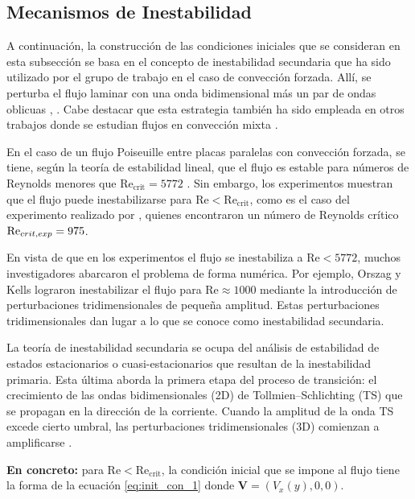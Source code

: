 \subsection{Mecanismos de Inestabilidad} \label{sec:mecanismo}

A continuación, la construcción de las condiciones iniciales que se consideran en \linebreak esta subsección se basa en el concepto de inestabilidad secundaria que ha sido utilizado por el grupo de trabajo en el caso de convección forzada. Allí, se perturba el flujo \linebreak laminar con una onda bidimensional más un par de ondas oblicuas \cite{machaca2024}, \cite{schmid}. Cabe destacar que esta estrategia también ha sido empleada en otros trabajos donde se estudian flujos en convección mixta \cite{chen2003direct}.  

En el caso de un flujo Poiseuille entre placas paralelas con convección forzada, se tiene, según la teoría de estabilidad lineal, que el flujo es estable para números de Reynolds menores que $\text{Re}_{\text{crit}}=5772$ \cite{orszag1971accurate}. Sin embargo, los experimentos muestran que el flujo puede inestabilizarse para $\text{Re} < \text{Re}_{\text{crit}}$, como es el caso del experimento realizado por \cite{kao1970experimental}, quienes encontraron un número de Reynolds crítico $\text{Re}_{\textcolor{black}{crit, exp}}= 975$. 

En vista de que en los experimentos el flujo se inestabiliza a $\text{Re} < 5772$, muchos investigadores abarcaron el problema  de forma numérica. Por ejemplo, Orszag y Kells \cite{orszag1980transition} lograron inestabilizar el flujo para  $\text{Re} \approx 1000$ mediante la introducción de perturbaciones tridimensionales de pequeña amplitud. Estas perturbaciones tridimensionales dan lugar a lo que se conoce como inestabilidad secundaria.

La teoría de inestabilidad secundaria se ocupa del análisis de estabilidad de estados estacionarios o cuasi-estacionarios que resultan de la inestabilidad primaria. Esta última aborda la primera etapa del proceso de transición: el crecimiento de las ondas bidimensionales (2D) de Tollmien–Schlichting (TS) \cite{tollmien1935, schlichting1933} que se propagan en la dirección de la corriente. Cuando la amplitud de la onda TS excede cierto umbral, las perturbaciones tridimensionales (3D) comienzan a amplificarse \cite{schmid}. 

\textbf{En concreto:} para $\text{Re} < \text{Re}_{\text{crit}}$, la condición inicial que se impone al flujo tiene la forma de la ecuación \ref{eq:init_con_1} donde $\mathbf{V}=(V_x(y),0,0)$.

